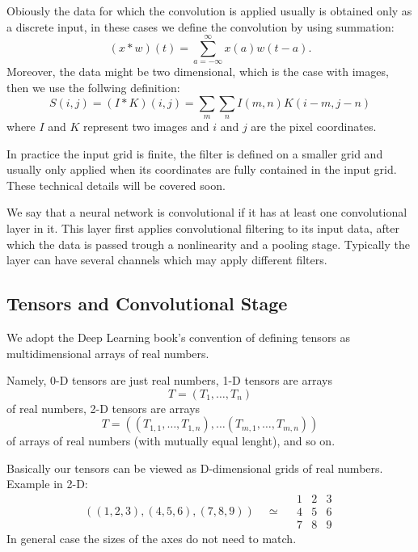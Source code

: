 \documentclass[]{article}
\begin{document}
Obiously the data for which the convolution is applied usually is obtained only
as a discrete input, in these cases we define the convolution by using
summation:
\[
(x * w)(t) = \sum_{a = -\infty}^{\infty} x(a)w(t - a).
\]
Moreover, the data might be two dimensional, which is the case with images, then
we use the follwing definition:
\[
S(i, j) = (I * K)(i, j) = \sum_m \sum_n I(m , n) K(i - m, j - n)
\]
where $I$ and $K$ represent two images and $i$ and $j$ are the pixel coordinates.

In practice the input grid is finite, the filter is defined on a smaller grid and
usually only applied when its coordinates are fully contained in the input grid.
These technical details will be covered soon.

We say that a neural network is convolutional if it has at least one convolutional
layer in it. This layer first applies convolutional filtering to its input data,
after which the data is passed trough a nonlinearity and a pooling stage. Typically
the layer can have several channels which may apply different filters.

\subsection{Tensors and Convolutional Stage}
We adopt the Deep Learning book's convention of defining tensors as
multidimensional arrays of real numbers.

Namely, 0-D tensors are just real numbers, 1-D tensors are arrays
\[
T = (T_1, \ldots, T_n)
\]
of real numbers, 2-D tensors are arrays
\[
T = ((T_{1,1}, \ldots, T_{1,n}), \ldots (T_{m,1}, \ldots, T_{m,n}))
\]
of arrays of real numbers (with mutually equal lenght), and so on.

Basically our tensors can be viewed as D-dimensional grids of real numbers.
Example in 2-D:
\[
((1, 2, 3), (4, 5, 6), (7, 8, 9)) \quad \simeq \quad
\begin{array}{c|c|c}
  1 & 2 & 3 \\
  \hline
  4 & 5 & 6 \\
  \hline
  7 & 8 & 9
 \end{array}
\]
In general case the sizes of the axes do not need to match.
\end{document}
